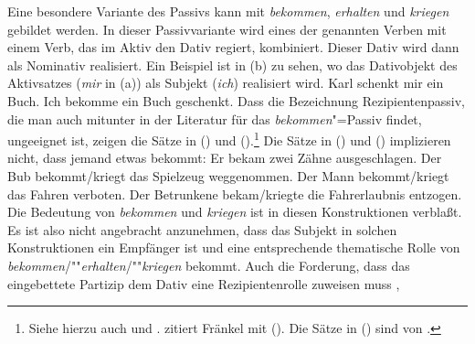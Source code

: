 %

Eine besondere Variante des Passivs kann mit \emph{bekommen},
\emph{erhalten} und \emph{kriegen}
gebildet werden. In dieser Passivvariante wird eines der genannten Verben
mit einem Verb, das im Aktiv den Dativ regiert, kombiniert. Dieser Dativ wird dann
als Nominativ realisiert. Ein Beispiel ist in (b) zu sehen, wo
das Dativobjekt des Aktivsatzes (\emph{mir} in (a)) als Subjekt (\emph{ich})
realisiert wird.
\eal
\ex{}
Karl schenkt mir      ein Buch.
\ex\label{ex-ich-bekommen-ein-buch-geschenkt} 
Ich     bekomme ein Buch       geschenkt.
\zl
Dass die Bezeichnung Rezipientenpassiv, die man auch mitunter in der 
Literatur für das \emph{bekommen}"=Passiv findet,
ungeeignet ist, zeigen die Sätze in () und ().\footnote{
        Siehe hierzu auch  
        und . 
        \citet*[]{Eroms78} zitiert Fränkel %
        mit (). %
        Die Sätze in () sind von \citet*[]{Reis76a}.
}
Die Sätze in () und () implizieren nicht, dass jemand etwas bekommt:
\ea{}
\label{bsp-zaehne-ausgeschlagen}
Er bekam zwei Zähne ausgeschlagen.
\z
\eal
\label{bsp-bekommen-passiv-mit-akk}
\ex
Der Bub bekommt/kriegt das Spielzeug weggenommen.
\ex{}
Der Mann bekommt/kriegt das Fahren  verboten.
\ex{}
Der Betrunkene bekam/kriegte die Fahrerlaubnis     entzogen.
\zl
Die Bedeutung von \emph{bekommen} und \emph{kriegen} ist in diesen
Konstruktionen verblaßt. Es ist also nicht angebracht anzunehmen,
dass das Subjekt in solchen Konstruktionen ein Empfänger ist und
eine entsprechende thematische Rolle von \emph{bekommen}/""\emph{erhalten}/""\emph{kriegen}
bekommt. Auch die Forderung, dass das eingebettete Partizip dem
Dativ eine Rezipientenrolle zuweisen muss \citep[]{Gunkel2003b},
